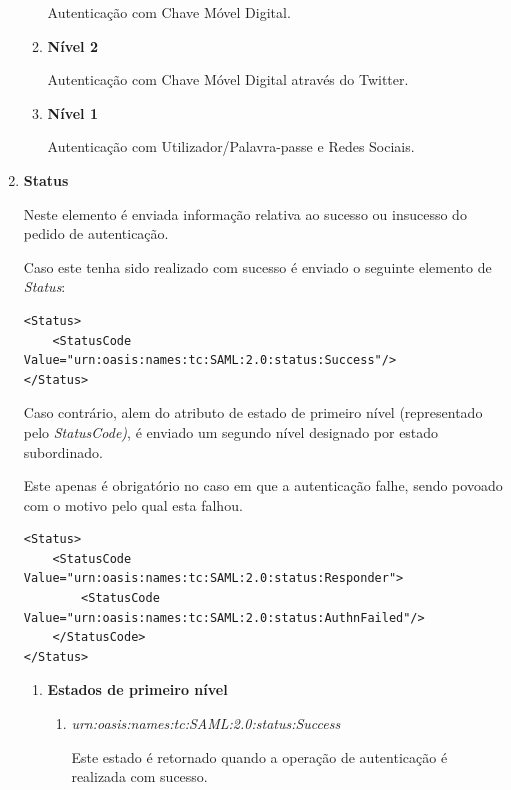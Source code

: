 \begin{enumerate}
\begin{enumerate}
        Autenticação com Chave Móvel Digital.
        
        \item \textbf{Nível 2}
        
        Autenticação com Chave Móvel Digital através do Twitter.
        
        \item \textbf{Nível 1}
        
        Autenticação com Utilizador/Palavra-passe  e Redes Sociais.
    \end{enumerate}
    
    \item \textbf{Status}
    
    Neste elemento é enviada informação relativa ao sucesso ou insucesso do pedido de autenticação. 
    
    Caso este tenha sido realizado com sucesso é enviado o seguinte elemento de \emph{Status}:
    
    \begin{lstlisting}
<Status>
    <StatusCode Value="urn:oasis:names:tc:SAML:2.0:status:Success"/>
</Status>
    \end{lstlisting}
    
    \vspace{-10mm}
    Caso contrário, alem do atributo de estado de primeiro nível (representado pelo \emph{StatusCode)}, é enviado um segundo nível designado por estado subordinado.
    
    Este apenas é obrigatório no caso em que a autenticação falhe, sendo povoado com o motivo pelo qual esta falhou.
    
    \begin{lstlisting}
<Status>
    <StatusCode  Value="urn:oasis:names:tc:SAML:2.0:status:Responder">
        <StatusCode Value="urn:oasis:names:tc:SAML:2.0:status:AuthnFailed"/>
    </StatusCode>
</Status>
    \end{lstlisting}
    
    \vspace{-10mm}
    \begin{enumerate}
        \item \textbf{Estados de primeiro nível}
        \begin{enumerate}
            \item \emph{urn:oasis:names:tc:SAML:2.0:status:Success}
            
            Este estado é retornado quando a operação de autenticação é realizada com sucesso.
            

\end{enumerate}
\end{enumerate}
\end{enumerate}
